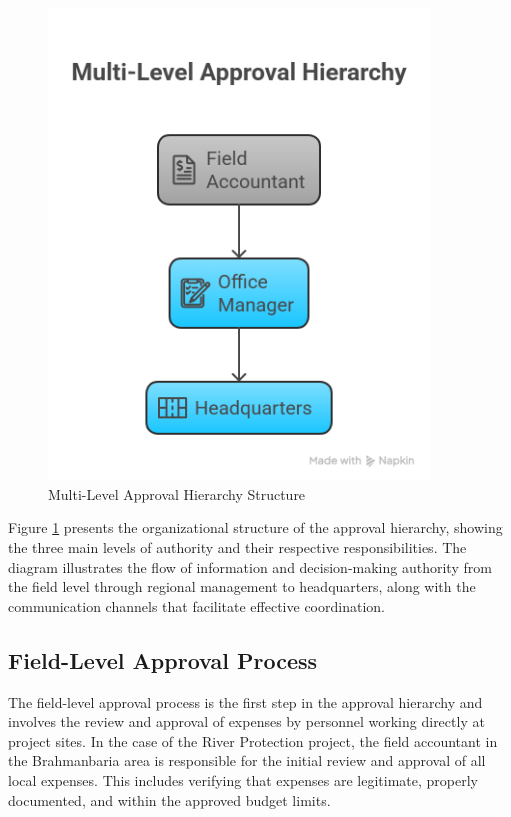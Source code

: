\begin{figure}[H]
    \centering
    \includegraphics[width=0.9\textwidth]{assets/images/approval_hierarchy.png}
    \caption{Multi-Level Approval Hierarchy Structure}
    \label{fig:approval_hierarchy}
\end{figure}

Figure \ref{fig:approval_hierarchy} presents the organizational structure of the approval hierarchy, showing the three main levels of authority and their respective responsibilities. The diagram illustrates the flow of information and decision-making authority from the field level through regional management to headquarters, along with the communication channels that facilitate effective coordination.

\subsection{Field-Level Approval Process}
The field-level approval process is the first step in the approval hierarchy and involves the review and approval of expenses by personnel working directly at project sites. In the case of the River Protection project, the field accountant in the Brahmanbaria area is responsible for the initial review and approval of all local expenses. This includes verifying that expenses are legitimate, properly documented, and within the approved budget limits.

